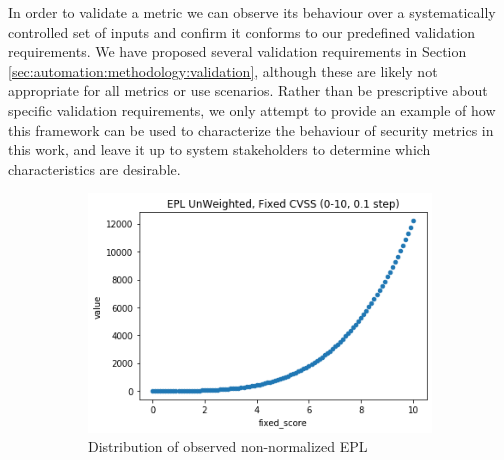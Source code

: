 
In order to validate a metric we can observe its behaviour over a systematically controlled set of inputs and confirm it conforms to our predefined validation requirements. We have proposed several validation requirements in Section \ref{sec:automation:methodology:validation}, although these are likely not appropriate for all metrics or use scenarios. Rather than be prescriptive about specific validation requirements, we only attempt to provide an example of how this framework can be used to characterize the behaviour of security metrics in this work, and leave it up to system stakeholders to determine which characteristics are desirable. 


\graphicspath{{resource/img/ch_automation/from_ares_paper/}}
\begin{figure}
    \centering
    \begin{subfigure}[t]{0.48\textwidth}
        \includegraphics[width=\linewidth]{output_37_1.png} 
        \caption{Distribution of observed non-normalized EPL} 
        \label{fig:automation:results:epl_dist_unnorm}
    \end{subfigure}
     \begin{subfigure}[t]{0.48\textwidth}
        \centering

\end{subfigure}
\end{figure}

